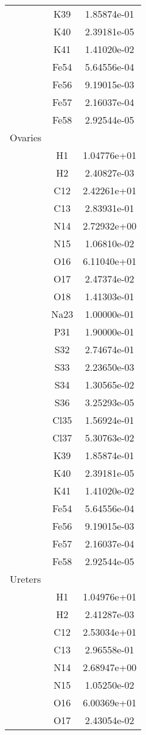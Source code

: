 \begin{centering}
\begin{longtable}{l c c}
& K39 & 1.85874e-01 \\ 
& K40 & 2.39181e-05 \\ 
& K41 & 1.41020e-02 \\ 
& Fe54 & 5.64556e-04 \\ 
& Fe56 & 9.19015e-03 \\ 
& Fe57 & 2.16037e-04 \\ 
& Fe58 & 2.92544e-05 \\ 
\hline
Ovaries & & \\
\hline
& H1 & 1.04776e+01 \\ 
& H2 & 2.40827e-03 \\ 
& C12 & 2.42261e+01 \\ 
& C13 & 2.83931e-01 \\ 
& N14 & 2.72932e+00 \\ 
& N15 & 1.06810e-02 \\ 
& O16 & 6.11040e+01 \\ 
& O17 & 2.47374e-02 \\ 
& O18 & 1.41303e-01 \\ 
& Na23 & 1.00000e-01 \\ 
& P31 & 1.90000e-01 \\ 
& S32 & 2.74674e-01 \\ 
& S33 & 2.23650e-03 \\ 
& S34 & 1.30565e-02 \\ 
& S36 & 3.25293e-05 \\ 
& Cl35 & 1.56924e-01 \\ 
& Cl37 & 5.30763e-02 \\ 
& K39 & 1.85874e-01 \\ 
& K40 & 2.39181e-05 \\ 
& K41 & 1.41020e-02 \\ 
& Fe54 & 5.64556e-04 \\ 
& Fe56 & 9.19015e-03 \\ 
& Fe57 & 2.16037e-04 \\ 
& Fe58 & 2.92544e-05 \\ 
\hline
Ureters & & \\
\hline
& H1 & 1.04976e+01 \\ 
& H2 & 2.41287e-03 \\ 
& C12 & 2.53034e+01 \\ 
& C13 & 2.96558e-01 \\ 
& N14 & 2.68947e+00 \\ 
& N15 & 1.05250e-02 \\ 
& O16 & 6.00369e+01 \\ 
& O17 & 2.43054e-02 \\ 

\end{longtable}
\end{centering}
